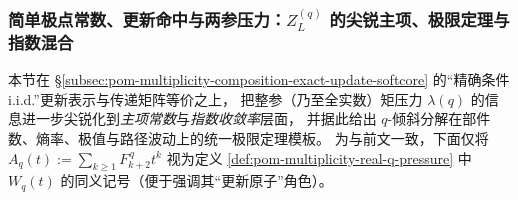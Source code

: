 %
%

\subsubsection{简单极点常数、更新命中与两参压力：\texorpdfstring{$Z_L^{(q)}$}{ZLq} 的尖锐主项、极限定理与指数混合}\label{subsec:pom-multiplicity-composition-sharp-asymptotics-renewal}
本节在 \S\ref{subsec:pom-multiplicity-composition-exact-update-softcore} 的“精确条件 i.i.d.”更新表示与传递矩阵等价之上，
把整参（乃至全实数）矩压力 \(\lambda(q)\) 的信息进一步尖锐化到\emph{主项常数}与\emph{指数收敛率}层面，
并据此给出 \(q\)-倾斜分解在部件数、熵率、极值与路径波动上的统一极限定理模板。
为与前文一致，下面仅将
\(
A_q(t):=\sum_{k\ge 1}F_{k+2}^{\,q}t^k
\)
视为定义 \ref{def:pom-multiplicity-real-q-pressure} 中 \(W_q(t)\) 的同义记号（便于强调其“更新原子”角色）。

